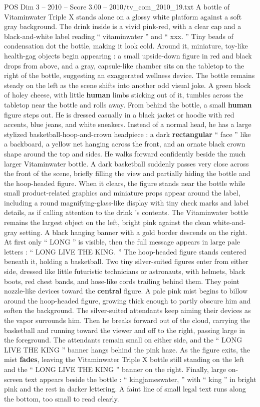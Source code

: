 \begin{textsample}{POS Dim 3 – 2010 – Score 3.00 – 2010/tv\_com\_2010\_19.txt}  \label{ex:f3_pos_087}
A bottle of Vitaminwater Triple X stands alone on a glossy white platform against a soft gray background.
The drink inside is a vivid pink-red, with a clear cap and a black-and-white label reading “ vitaminwater ” and “ xxx. ” Tiny beads of condensation dot the bottle, making it look cold.
Around it, miniature, toy-like health-gag objects begin appearing : a small upside-down figure in red and black drops from above, and a gray, capsule-like chamber sits on the tabletop to the right of the bottle, suggesting an exaggerated wellness device.
The bottle remains steady on the left as the scene shifts into another odd visual joke.
A green block of holey cheese, with little \textbf{human} limbs sticking out of it, tumbles across the tabletop near the bottle and rolls away.
From behind the bottle, a small \textbf{human} figure steps out.
He is dressed casually in a black jacket or hoodie with red accents, blue jeans, and white sneakers.
Instead of a normal head, he has a large stylized basketball-hoop-and-crown headpiece : a dark \textbf{rectangular} “ face ” like a backboard, a yellow net hanging across the front, and an ornate black crown shape around the top and sides.
He walks forward confidently beside the much larger Vitaminwater bottle.
A dark basketball suddenly passes very close across the front of the scene, briefly filling the view and partially hiding the bottle and the hoop-headed figure.
When it clears, the figure stands near the bottle while small product-related graphics and miniature props appear around the label, including a round magnifying-glass-like display with tiny check marks and label details, as if calling attention to the drink ’s contents.
The Vitaminwater bottle remains the largest object on the left, bright pink against the clean white-and-gray setting.
A black hanging banner with a gold border descends on the right.
At first only “ LONG ” is visible, then the full message appears in large pale letters : “ LONG LIVE THE KING. ” The hoop-headed figure stands centered beneath it, holding a basketball.
Two tiny silver-suited figures enter from either side, dressed like little futuristic technicians or astronauts, with helmets, black boots, red chest bands, and hose-like cords trailing behind them.
They point nozzle-like devices toward the \textbf{central} figure.
A pale pink mist begins to billow around the hoop-headed figure, growing thick enough to partly obscure him and soften the background.
The silver-suited attendants keep aiming their devices as the vapor surrounds him.
Then he breaks forward out of the cloud, carrying the basketball and running toward the viewer and off to the right, passing large in the foreground.
The attendants remain small on either side, and the “ LONG LIVE THE KING ” banner hangs behind the pink haze.
As the figure exits, the mist \textbf{fades}, leaving the Vitaminwater Triple X bottle still standing on the left and the “ LONG LIVE THE KING ” banner on the right.
Finally, large on-screen text appears beside the bottle : “ kingjameswater, ” with “ king ” in bright pink and the rest in darker lettering.
A faint line of small legal text runs along the bottom, too small to read clearly.

\end{textsample}
